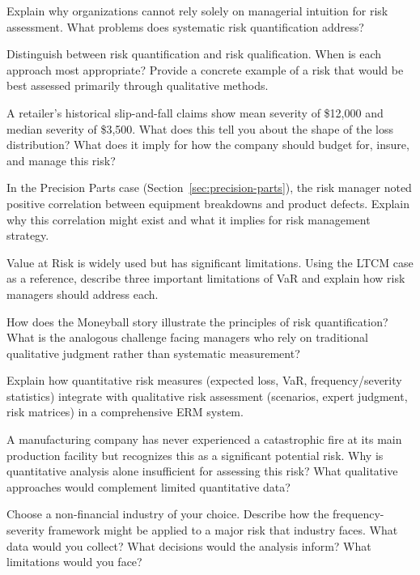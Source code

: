 \documentclass[11pt,openany]{book}
\begin{document}
\begin{discussionquestions}
\item Explain why organizations cannot rely solely on managerial intuition for
  risk assessment. What problems does systematic risk quantification address?

\item Distinguish between risk quantification and risk qualification. When is
  each approach most appropriate? Provide a concrete example of a risk that
  would be best assessed primarily through qualitative methods.

\item A retailer's historical slip-and-fall claims show mean severity of
  \$12,000 and median severity of \$3,500. What does this tell you about the
  shape of the loss distribution? What does it imply for how the company should
  budget for, insure, and manage this risk?

\item In the Precision Parts case (Section~\ref{sec:precision-parts}), the risk
  manager noted positive correlation between equipment breakdowns and product
  defects. Explain why this correlation might exist and what it implies for risk
  management strategy.

\item Value at Risk is widely used but has significant limitations. Using the
  LTCM case as a reference, describe three important limitations of VaR and
  explain how risk managers should address each.

\item How does the Moneyball story illustrate the principles of risk
  quantification? What is the analogous challenge facing managers who rely on
  traditional qualitative judgment rather than systematic measurement?

\item Explain how quantitative risk measures (expected loss, VaR,
  frequency/severity statistics) integrate with qualitative risk assessment
  (scenarios, expert judgment, risk matrices) in a comprehensive ERM system.

\item A manufacturing company has never experienced a catastrophic fire at its
  main production facility but recognizes this as a significant potential risk.
  Why is quantitative analysis alone insufficient for assessing this risk? What
  qualitative approaches would complement limited quantitative data?

\item Choose a non-financial industry of your choice. Describe how the
  frequency-severity framework might be applied to a major risk that industry
  faces. What data would you collect? What decisions would the analysis inform?
  What limitations would you face?
\end{discussionquestions}
\end{document}
